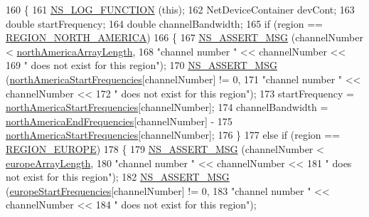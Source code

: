 \begin{DoxyCode}
160 \{
161   \hyperlink{log-macros-disabled_8h_a90b90d5bad1f39cb1b64923ea94c0761}{NS\_LOG\_FUNCTION} (\textcolor{keyword}{this});
162   NetDeviceContainer devCont;
163   \textcolor{keywordtype}{double} startFrequency;
164   \textcolor{keywordtype}{double} channelBandwidth;
165   \textcolor{keywordflow}{if} (region == \hyperlink{classns3_1_1TvSpectrumTransmitterHelper_a7b4aafcd25156458e9ec922587169bbea056d73a4fde73ff587515aba0b9f0178}{REGION\_NORTH\_AMERICA})
166     \{
167       \hyperlink{assert_8h_aff5ece9066c74e681e74999856f08539}{NS\_ASSERT\_MSG} (channelNumber < \hyperlink{namespacens3_a74efef1e0d1e67a89e219a39f06b881e}{northAmericaArrayLength},
168                      \textcolor{stringliteral}{"channel number "} << channelNumber <<
169                      \textcolor{stringliteral}{" does not exist for this region"});
170       \hyperlink{assert_8h_aff5ece9066c74e681e74999856f08539}{NS\_ASSERT\_MSG} (\hyperlink{namespacens3_abd0dc95c8909f85e962a681d932219d3}{northAmericaStartFrequencies}[channelNumber] 
      != 0,
171                      \textcolor{stringliteral}{"channel number "} << channelNumber <<
172                      \textcolor{stringliteral}{" does not exist for this region"});
173       startFrequency = \hyperlink{namespacens3_abd0dc95c8909f85e962a681d932219d3}{northAmericaStartFrequencies}[channelNumber];    
174       channelBandwidth = \hyperlink{namespacens3_a0808a28c1d4e8691369f8d7700e6deaa}{northAmericaEndFrequencies}[channelNumber] - 
175                          \hyperlink{namespacens3_abd0dc95c8909f85e962a681d932219d3}{northAmericaStartFrequencies}[channelNumber];
176     \}
177   \textcolor{keywordflow}{else} \textcolor{keywordflow}{if} (region == \hyperlink{classns3_1_1TvSpectrumTransmitterHelper_a7b4aafcd25156458e9ec922587169bbeaa28b9c30091d0f924883332dd748e796}{REGION\_EUROPE})
178     \{
179       \hyperlink{assert_8h_aff5ece9066c74e681e74999856f08539}{NS\_ASSERT\_MSG} (channelNumber < \hyperlink{namespacens3_ac2219660b69e86f221be17c4f0cfac4d}{europeArrayLength},
180                      \textcolor{stringliteral}{"channel number "} << channelNumber <<
181                      \textcolor{stringliteral}{" does not exist for this region"});
182       \hyperlink{assert_8h_aff5ece9066c74e681e74999856f08539}{NS\_ASSERT\_MSG} (\hyperlink{namespacens3_aa7262dcdf15461a937bb8d2afa65288c}{europeStartFrequencies}[channelNumber] != 0,
183                      \textcolor{stringliteral}{"channel number "} << channelNumber <<
184                      \textcolor{stringliteral}{" does not exist for this region"});

\end{DoxyCode}
